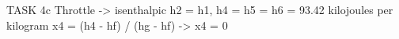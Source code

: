 TASK 4c
Throttle -> isenthalpic  
h2 = h1, h4 = h5 = h6 = 93.42 kilojoules per kilogram  
x4 = (h4 - hf) / (hg - hf) -> x4 = 0